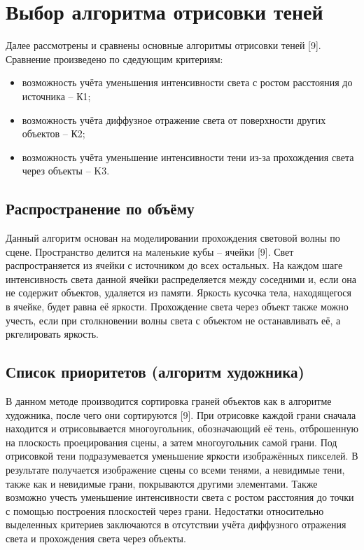 \section{Выбор алгоритма отрисовки теней} {
    Далее рассмотрены и сравнены основные алгоритмы отрисовки теней [9].
    Сравнение произведено по сдедующим критериям:
    \begin{itemize}
        \item возможность учёта уменьшения интенсивности света с ростом
        расстояния до источника -- К1;
        \item возможность учёта диффузное отражение света
        от поверхности других объектов -- К2;
        \item возможность учёта уменьшение интенсивности тени из-за
        прохождения света через объекты -- K3.
    \end{itemize}
    
    \subsection{Распространение по объёму} {
        Данный алгоритм основан на моделировании прохождения световой волны по сцене.
        Пространство делится на маленькие кубы -- ячейки [9].
        Свет распространяется из ячейки с источником до всех остальных.
        На каждом шаге интенсивность света данной ячейки распределяется между
        соседними и, если она не содержит объектов, удаляется из памяти.
        Яркость кусочка тела, находящегося в ячейке, будет равна её яркости.
        Прохождение света через объект также можно учесть, если при столкновении волны света с объектом не останавливать её, а ркгелировать яркость.
    }
    \subsection{Список приоритетов (алгоритм художника)} {
        В данном методе производится сортировка граней объектов
        как в алгоритме художника, после чего они сортируются [9].
        При отрисовке каждой грани сначала находится и отрисовывается
        многоугольник, обозначающий её тень, отброшенную на плоскость
        проецирования сцены, а затем многоугольник самой грани.
        Под отрисовкой тени подразумевается уменьшение яркости изображённых пикселей.
        В результате получается изображение сцены со всеми тенями, а невидимые тени,
        также как и невидимые грани, покрываются другими элементами.
        Также возможно учесть уменьшение интенсивности света с ростом
        расстояния до точки с помощью построения плоскостей через грани.
        Недостатки относительно выделенных критериев заключаются в отсутствии учёта
        диффузного отражения света и прохождения света через объекты.
    }
}
